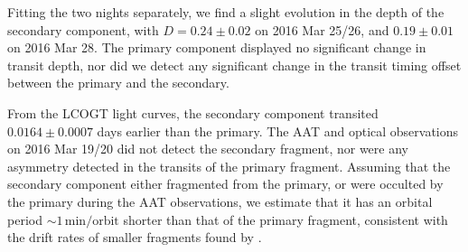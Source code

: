 \documentclass[useAMS,usenatbib]{mn2e}
\begin{document}
Fitting the two nights separately, we find a slight evolution in the depth of the secondary component, with $D=0.24\pm0.02$ on 2016 Mar 25/26, and $0.19\pm0.01$ on 2016 Mar 28. The primary component displayed no significant change in transit depth, nor did we detect any significant change in the transit timing offset between the primary and the secondary.

From the LCOGT light curves, the secondary component transited $0.0164 \pm 0.0007$ days earlier than the primary. The AAT and optical observations on 2016 Mar 19/20 did not detect the secondary fragment, nor were any asymmetry detected in the transits of the primary fragment. Assuming that the secondary component either fragmented from the primary, or were occulted by the primary during the AAT observations, we estimate that it has an orbital period $\sim 1\,\mathrm{min/orbit}$ shorter than that of the primary fragment, consistent with the drift rates of smaller fragments found by \citet{2016MNRAS.tmp..406R}.   
\end{document}
